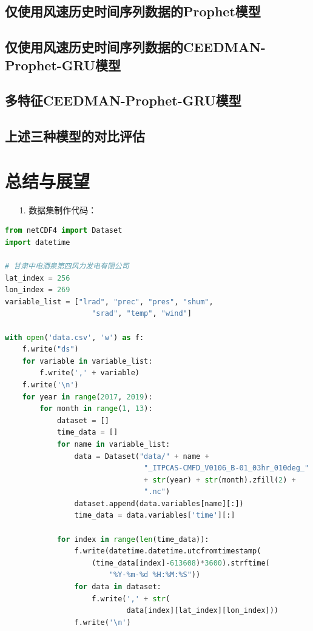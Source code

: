 \documentclass[AutoFakeBold]{LZUThesis}
\begin{document}
\section{仅使用风速历史时间序列数据的Prophet模型}

\section{仅使用风速历史时间序列数据的CEEDMAN-Prophet-GRU模型}

\section{多特征CEEDMAN-Prophet-GRU模型}

\section{上述三种模型的对比评估}


\chapter{总结与展望}

\backmatter


\printbib


\Appendix


\begin{itemize}
\item[1. ] 数据集制作代码：
\end{itemize}

\begin{lstlisting}[language = python]
from netCDF4 import Dataset
import datetime

# 甘肃中电酒泉第四风力发电有限公司
lat_index = 256
lon_index = 269
variable_list = ["lrad", "prec", "pres", "shum",
                    "srad", "temp", "wind"]

with open('data.csv', 'w') as f:
    f.write("ds")
    for variable in variable_list:
        f.write(',' + variable)
    f.write('\n')
    for year in range(2017, 2019):
        for month in range(1, 13):
            dataset = []
            time_data = []
            for name in variable_list:
                data = Dataset("data/" + name + 
                                "_ITPCAS-CMFD_V0106_B-01_03hr_010deg_"
                                + str(year) + str(month).zfill(2) +
                                ".nc")
                dataset.append(data.variables[name][:])
                time_data = data.variables['time'][:]

            for index in range(len(time_data)):
                f.write(datetime.datetime.utcfromtimestamp(
                    (time_data[index]-613608)*3600).strftime(
                        "%Y-%m-%d %H:%M:%S"))
                for data in dataset:
                    f.write(',' + str(
                            data[index][lat_index][lon_index]))
                f.write('\n')
\end{lstlisting}
\end{document}
